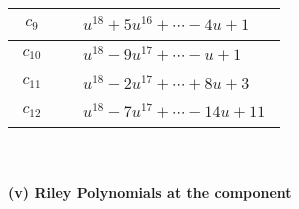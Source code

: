 \documentclass[1p]{elsarticle_modified}
\theoremstyle{definition}
\begin{document}
\begin{tabular}{m{50pt}|m{274pt}}
\hline $$\begin{aligned}c_{9}\end{aligned}$$&$\begin{aligned}
&u^{18}+5 u^{16}+\cdots-4 u+1
\end{aligned}$\\
\hline $$\begin{aligned}c_{10}\end{aligned}$$&$\begin{aligned}
&u^{18}-9 u^{17}+\cdots- u+1
\end{aligned}$\\
\hline $$\begin{aligned}c_{11}\end{aligned}$$&$\begin{aligned}
&u^{18}-2 u^{17}+\cdots+8 u+3
\end{aligned}$\\
\hline $$\begin{aligned}c_{12}\end{aligned}$$&$\begin{aligned}
&u^{18}-7 u^{17}+\cdots-14 u+11
\end{aligned}$\\
\hline
\end{tabular}\\~\\
\newpage\renewcommand{\arraystretch}{1}
\flushleft \textbf{(v) Riley Polynomials at the component}\newline \\
\end{document}

